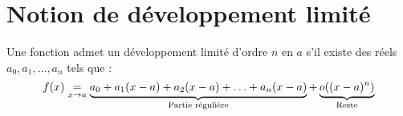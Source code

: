 \section{Notion de développement limité}
	
	Une fonction admet un développement limité d'ordre $n$ en $a$ s'il existe des réels $a_0, a_1, \ldots, a_n$ tels que :\\
	\[f(x) \underset{x \rightarrow a}{=} \underbrace{a_0 + a_1 (x - a) + a_2 (x - a) + \ldots + a_n (x - a)}_\textrm{Partie régulière} + \underbrace{o((x - a)^n)}_\textrm{Reste}\]
	
	
